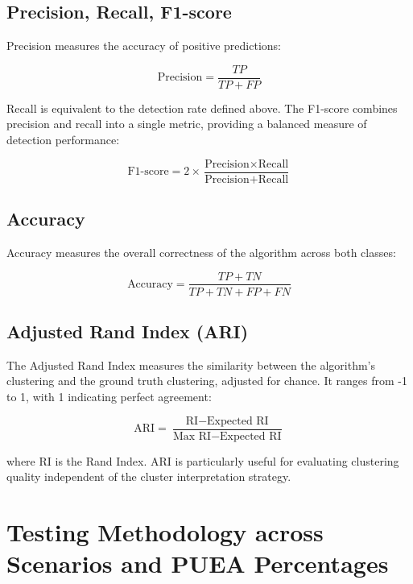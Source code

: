 \subsection{Precision, Recall, F1-score}

Precision measures the accuracy of positive predictions:

\begin{equation}
    \text{Precision} = \frac{TP}{TP + FP}
\end{equation}

Recall is equivalent to the detection rate defined above. The F1-score combines precision and recall into a single metric, providing a balanced measure of detection performance:

\begin{equation}
    \text{F1-score} = 2 \times \frac{\text{Precision} \times \text{Recall}}{\text{Precision} + \text{Recall}}
\end{equation}

\subsection{Accuracy}

Accuracy measures the overall correctness of the algorithm across both classes:

\begin{equation}
    \text{Accuracy} = \frac{TP + TN}{TP + TN + FP + FN}
\end{equation}

\subsection{Adjusted Rand Index (ARI)}

The Adjusted Rand Index measures the similarity between the algorithm's clustering and the ground truth clustering, adjusted for chance. It ranges from -1 to 1, with 1 indicating perfect agreement:

\begin{equation}
    \text{ARI} = \frac{\text{RI} - \text{Expected RI}}{\text{Max RI} - \text{Expected RI}}
\end{equation}

where RI is the Rand Index. ARI is particularly useful for evaluating clustering quality independent of the cluster interpretation strategy.

\section{Testing Methodology across Scenarios and PUEA Percentages}


